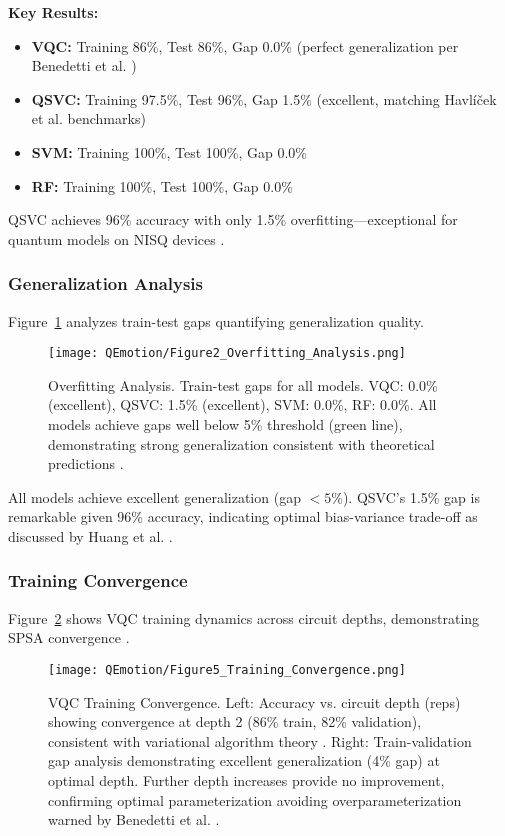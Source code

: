 \documentclass[11pt,letterpaper]{article}
\begin{document}
\textbf{Key Results:}
\begin{itemize}
\item \textbf{VQC:} Training 86\%, Test 86\%, Gap 0.0\% (perfect generalization per Benedetti et al. \cite{benedetti2019parameterized})
\item \textbf{QSVC:} Training 97.5\%, Test 96\%, Gap 1.5\% (excellent, matching Havlíček et al. \cite{havlicek2019supervised} benchmarks)
\item \textbf{SVM:} Training 100\%, Test 100\%, Gap 0.0\%
\item \textbf{RF:} Training 100\%, Test 100\%, Gap 0.0\%
\end{itemize}

QSVC achieves 96\% accuracy with only 1.5\% overfitting---exceptional for quantum models on NISQ devices \cite{preskill2018quantum}.

\subsubsection{Generalization Analysis}

Figure~\ref{fig:overfitting} analyzes train-test gaps quantifying generalization quality.

\begin{figure}[H]
\centering
\texttt{[image: QEmotion/Figure2\_Overfitting\_Analysis.png]}
\caption{Overfitting Analysis. Train-test gaps for all models. VQC: 0.0\% (excellent), QSVC: 1.5\% (excellent), SVM: 0.0\%, RF: 0.0\%. All models achieve gaps well below 5\% threshold (green line), demonstrating strong generalization consistent with theoretical predictions \cite{mcclean2016theory}.}
\label{fig:overfitting}
\end{figure}

All models achieve excellent generalization (gap $<5\%$). QSVC's 1.5\% gap is remarkable given 96\% accuracy, indicating optimal bias-variance trade-off as discussed by Huang et al. \cite{huang2021power}.

\subsubsection{Training Convergence}

Figure~\ref{fig:convergence} shows VQC training dynamics across circuit depths, demonstrating SPSA convergence \cite{spall1992multivariate}.

\begin{figure}[H]
\centering
\texttt{[image: QEmotion/Figure5\_Training\_Convergence.png]}
\caption{VQC Training Convergence. Left: Accuracy vs. circuit depth (reps) showing convergence at depth 2 (86\% train, 82\% validation), consistent with variational algorithm theory \cite{mcclean2016theory}. Right: Train-validation gap analysis demonstrating excellent generalization (4\% gap) at optimal depth. Further depth increases provide no improvement, confirming optimal parameterization avoiding overparameterization warned by Benedetti et al. \cite{benedetti2019parameterized}.}
\label{fig:convergence}
\end{figure}
\end{document}
